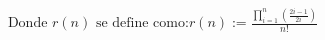 \documentclass[preview]{standalone}
\begin{document}
\begin{align*}
\text{Donde }r(n) \text{ se define como:}
r(n) := \frac{\displaystyle\prod_{i=1}^{n} \left(\frac{2i-1}{2i}\right)}{n!}
\end{align*}
\end{document}
